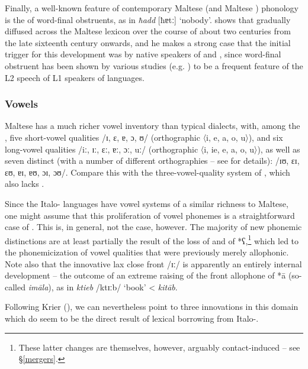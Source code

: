 \documentclass[output=paper]{langsci/langscibook}
\begin{document}
Finally, a well-known feature of contemporary Maltese (and Maltese ) phonology is the  of word-final obstruents, as in \textit{ħadd} [ħɐtː] `nobody'. \cite{Avram2017devoicing} shows that  gradually diffused across the Maltese lexicon over the course  of about two centuries from the late sixteenth century onwards, and he makes a strong case that the initial trigger for this development was  by native speakers of  and , since  word-final obstruent  has been shown by various studies (e.g. \citealt{Flegemunromackay1995}) to be a frequent feature of the L2 speech of L1 speakers of  languages.

\subsubsection{Vowels} %

Maltese has a much richer vowel  inventory than typical   dialects, with, among the , five short-vowel qualities /ɪ, ɛ, ɐ, ɔ, ʊ/ (orthographic 〈i, e, a, o, u〉), and six long-vowel qualities /iː, ɪː, ɛː, ɐː, ɔː, uː/ (orthographic 〈i, ie, e, a, o, u〉), as well as seven distinct  (with a number of different orthographies -- see \citealt[299]{BorgAzzopardi-Alexander1997} for details): /ɪʊ, ɛɪ, ɛʊ, ɐɪ, ɐʊ, ɔɪ, ɔʊ/. Compare this with the three-vowel-quality system of  , which also lacks  \citep{Gibson2011}.


Since the Italo- languages have vowel systems of a similar richness to Maltese, one might assume that this proliferation of vowel phonemes is a straightforward case of . This is, in general, not the case, however. The majority of new phonemic distinctions are at least partially the result of the loss of  and of *ʕ,\footnote{These latter changes are themselves, however, arguably contact-induced -- see §\ref{mergers}.} which led to the phonemicization of vowel qualities that were previously merely allophonic. Note also that the innovative lax close front  /ɪː/ is apparently an entirely internal development -- the outcome of an extreme raising of the front allophone of *\={a} (so-called \textit{im\={a}la}), as in \textit{ktieb} /ktɪːb/ `book' < \textit{kit\={a}b}.

Following Krier (\citeyear[21--22]{krier1976}), we can nevertheless point to three innovations in this domain which do seem to be the direct result of lexical borrowing from Italo-.
\end{document}

